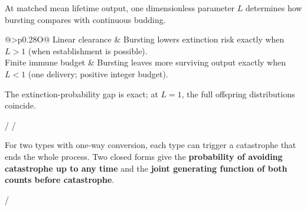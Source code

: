 \setlength{\fboxsep}{10pt}
\colorbox{oipanel}{%
  \begin{minipage}{\dimexpr\linewidth-2\fboxsep\relax}
    \vspace{3pt}
    \quad{}\par
    \vspace{6pt}
    {\fontsize{10.5}{13.3}\selectfont\raggedright
    At matched mean lifetime output, one dimensionless parameter $L$
    determines how bursting compares with continuous budding.\par
    \vspace{6pt}
    \begin{tabularx}{\linewidth}{@{}>{\bfseries}p{0.28\linewidth}O@{}}
      Linear clearance &
      Bursting lowers extinction risk exactly when $L>1$
      (when establishment is possible). \\[4pt]
      Finite immune budget &
      Bursting leaves more surviving output exactly when $L<1$
      (one delivery; positive integer budget). \\
    \end{tabularx}\par
    \vspace{6pt}
    The extinction-probability gap is exact; at $L=1$, the full offspring
    distributions coincide.\par}
    \vspace{5pt}
    {\fontsize{9}{11}\selectfont
    \enspace\textcolor{oisoft}{/}\enspace
    \enspace\textcolor{oisoft}{/}\enspace
    \par}
  \end{minipage}%
}\par
\vspace{13pt}

\vspace{3pt}
\par
\vspace{5pt}
{\fontsize{10.5}{13.3}\selectfont\raggedright
For two types with one-way conversion, each type can trigger a catastrophe
that ends the whole process. Two closed forms give the
\textbf{probability of avoiding catastrophe up to any time} and the
\textbf{joint generating function of both counts before catastrophe}.\par}
\vspace{5pt}
{\fontsize{9}{11}\selectfont
{}\enspace\textcolor{oisoft}{/}\enspace
{}\par}
\vspace{11pt}

